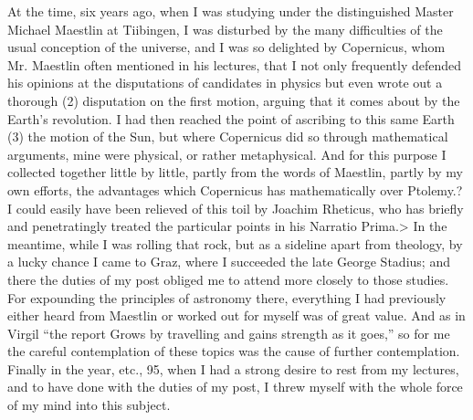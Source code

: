 \documentclass{article}
\begin{document}
{{{{{{{At the time, six years ago, when I was studying under the distinguished Master
Michael Maestlin at Tiibingen, I was disturbed by the many difficulties of the
usual conception of the universe, and I was so delighted by Copernicus, whom
Mr. Maestlin often mentioned in his lectures, that I not only frequently defended
his opinions at the disputations of candidates in physics but even wrote out a
thorough (2) disputation on the first motion, arguing that it comes about by the
Earth’s revolution. I had then reached the point of ascribing to this same Earth (3)
the motion of the Sun, but where Copernicus did so through mathematical
arguments, mine were physical, or rather metaphysical. And for this purpose I
collected together little by little, partly from the words of Maestlin, partly by my
own efforts, the advantages which Copernicus has mathematically over Ptolemy.?
I could easily have been relieved of this toil by Joachim Rheticus, who has briefly
and penetratingly treated the particular points in his Narratio Prima.> In the
meantime, while I was rolling that rock, but as a sideline apart from theology, by
a lucky chance I came to Graz, where I succeeded the late George Stadius; and
there the duties of my post obliged me to attend more closely to those studies. For
expounding the principles of astronomy there, everything I had previously either
heard from Maestlin or worked out for myself was of great value. And as in
Virgil “the report Grows by travelling and gains strength as it goes,” so for me
the careful contemplation of these topics was the cause of further contemplation.
Finally in the year, etc., 95, when I had a strong desire to rest from my lectures,
and to have done with the duties of my post, I threw myself with the whole force
of my mind into this subject.

}}}}}}}
\end{document}
